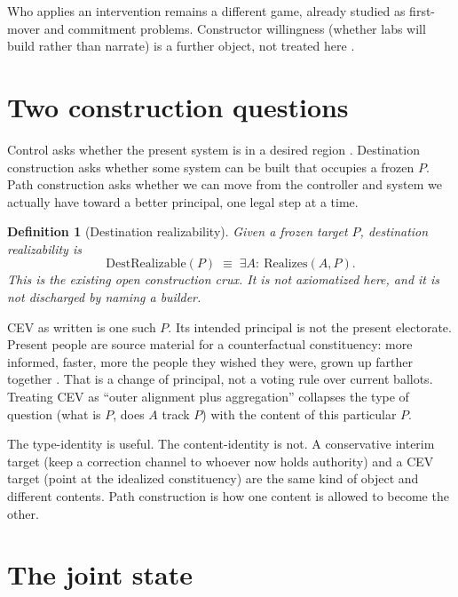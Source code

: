 \documentclass[11pt]{article}
\newtheorem{definition}{Definition}
\begin{document}
Who applies an intervention remains a different game, already studied as first-mover and commitment problems.
Constructor willingness (whether labs will build rather than narrate) is a further object, not treated here \parencite{zarncke2026attractors}.

\section{Two construction questions}

Control asks whether the present system is in a desired region \parencite{christiano2018corrigibility,soares2015corrigibility}.
Destination construction asks whether some system can be built that occupies a frozen \(P\).
Path construction asks whether we can move from the controller and system we actually have toward a better principal, one legal step at a time.

\begin{definition}[Destination realizability]
\label{def:destination}
Given a frozen target \(P\), destination realizability is
\begin{equation}
    \mathrm{DestRealizable}(P)
    \;\equiv\;
    \exists A:\ \mathrm{Realizes}(A,P).
\end{equation}
This is the existing open construction crux.
It is not axiomatized here, and it is not discharged by naming a builder.
\end{definition}

CEV as written is one such \(P\).
Its intended principal is not the present electorate.
Present people are source material for a counterfactual constituency: more informed, faster, more the people they wished they were, grown up farther together \parencite{yudkowsky2004cev}.
That is a change of principal, not a voting rule over current ballots.
Treating CEV as ``outer alignment plus aggregation'' collapses the type of question (what is \(P\), does \(A\) track \(P\)) with the content of this particular \(P\).

The type-identity is useful.
The content-identity is not.
A conservative interim target (keep a correction channel to whoever now holds authority) and a CEV target (point at the idealized constituency) are the same kind of object and different contents.
Path construction is how one content is allowed to become the other.

\section{The joint state}
\end{document}
